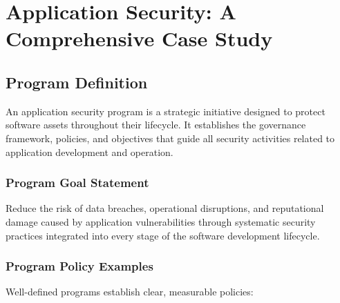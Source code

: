\documentclass[11pt,letterpaper]{article}
\begin{document}
\section{Application Security: A Comprehensive Case Study}

\subsection{Program Definition}

An application security program is a strategic initiative designed to protect software assets throughout their lifecycle. It establishes the governance framework, policies, and objectives that guide all security activities related to application development and operation.

\subsubsection{Program Goal Statement}

\begin{keyconceptbox}
Reduce the risk of data breaches, operational disruptions, and reputational damage caused by application vulnerabilities through systematic security practices integrated into every stage of the software development lifecycle.
\end{keyconceptbox}

\subsubsection{Program Policy Examples}

Well-defined programs establish clear, measurable policies:
\end{document}
